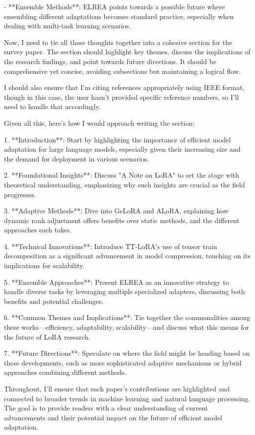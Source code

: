 \documentclass[conference]{IEEEtran}
\begin{document}
- **Ensemble Methods**: ELREA points towards a possible future where ensembling different adaptations becomes standard practice, especially when dealing with multi-task learning scenarios.

Now, I need to tie all these thoughts together into a cohesive section for the survey paper. The section should highlight key themes, discuss the implications of the research findings, and point towards future directions. It should be comprehensive yet concise, avoiding subsections but maintaining a logical flow.

I should also ensure that I'm citing references appropriately using IEEE format, though in this case, the user hasn't provided specific reference numbers, so I'll need to handle that accordingly.

Given all this, here's how I would approach writing the section:

1. **Introduction**: Start by highlighting the importance of efficient model adaptation for large language models, especially given their increasing size and the demand for deployment in various scenarios.

2. **Foundational Insights**: Discuss "A Note on LoRA" to set the stage with theoretical understanding, emphasizing why such insights are crucial as the field progresses.

3. **Adaptive Methods**: Dive into GeLoRA and ALoRA, explaining how dynamic rank adjustment offers benefits over static methods, and the different approaches each takes.

4. **Technical Innovations**: Introduce TT-LoRA's use of tensor train decomposition as a significant advancement in model compression, touching on its implications for scalability.

5. **Ensemble Approaches**: Present ELREA as an innovative strategy to handle diverse tasks by leveraging multiple specialized adapters, discussing both benefits and potential challenges.

6. **Common Themes and Implications**: Tie together the commonalities among these works—efficiency, adaptability, scalability—and discuss what this means for the future of LoRA research.

7. **Future Directions**: Speculate on where the field might be heading based on these developments, such as more sophisticated adaptive mechanisms or hybrid approaches combining different methods.

Throughout, I'll ensure that each paper's contributions are highlighted and connected to broader trends in machine learning and natural language processing. The goal is to provide readers with a clear understanding of current advancements and their potential impact on the future of efficient model adaptation.
\end{document}

